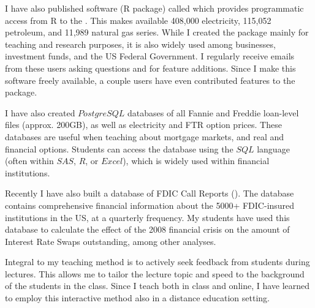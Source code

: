 \documentclass[12pt]{article}
\begin{document}
I have also published software (R package) called \href{https://cran.r-project.org/web/packages/EIAdata/index.html}{\color{Blue}{EIAdata}} which provides programmatic access from R to the \href{http://www.eia.gov/beta/api/index.cfm}{\color{Blue}{EIA's API}}.  This makes available 408,000 electricity, 115,052 petroleum, and 11,989 natural gas series.  While I created the package mainly for teaching and research purposes, it is also widely used among businesses, investment funds, and the US Federal Government.  I regularly receive emails from these users asking questions and for feature additions.  Since I make this software freely available, a couple users have even contributed features to the package.


I have also created $PostgreSQL$ databases of all Fannie and Freddie loan-level files (approx. 200GB), as well as electricity and FTR option prices.  These databases are useful when teaching about mortgage markets, and real and financial options.  Students can access the database using the $SQL$ language (often within $SAS$, $R$, or $Excel$), which is widely used within financial institutions.

Recently I have also built a database of FDIC Call Reports (\href{https://github.com/Matt-Brigida/FFIEC_Call_Reports}{\color{Blue}{available here}}).  The database contains comprehensive financial information about the 5000+ FDIC-insured institutions in the US, at a quarterly frequency. My students have used this database to calculate the effect of the 2008 financial crisis on the amount of Interest Rate Swaps outstanding, among other analyses.

Integral to my teaching method is to actively seek feedback from students during lectures.  This allows me to tailor the lecture topic and speed to the background of the students in the class. Since I teach both in class and online, I have learned to employ this interactive method also in a distance education setting.  
\end{document}
